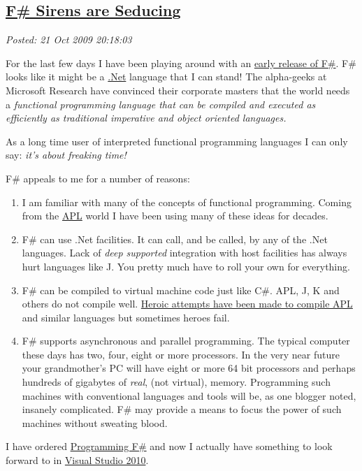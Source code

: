 %

\subsection*{\href{https://bakerjd99.wordpress.com/2009/10/21/f-sirens-are-seducing/}{F\# Sirens are Seducing}}


\noindent\emph{Posted: 21 Oct 2009 20:18:03}
\vspace{6pt}

For the last few days I have been playing around with an
\href{http://research.microsoft.com/en-us/um/cambridge/projects/fsharp/}{early
release of F\#}. F\# looks like it might be a
\href{http://www.microsoft.com/NET/}{.Net} language that I can stand!
The alpha-geeks at Microsoft Research have convinced their corporate
masters that the world needs a \emph{functional programming language
that can be compiled and executed as efficiently as traditional
imperative and object oriented languages.}

As a long time user of interpreted functional programming languages I
can only say: \emph{it's about freaking time!}

F\# appeals to me for a number of reasons:

\begin{enumerate}
\item
  I am familiar with many of the concepts of functional programming.
  Coming from the
  \href{http://en.wikipedia.org/wiki/APL\_(programming\_language)}{APL}
  world I have been using many of these ideas for decades.
\item
  F\# can use .Net facilities. It can call, and be called, by any of the
  .Net languages. Lack of \emph{deep supported} integration with host
  facilities has always hurt languages like J. You pretty much have to
  roll your own for everything.
\item
  F\# can be compiled to virtual machine code just like C\#. APL, J, K
  and others do not compile well.
  \href{http://www.snakeisland.com/}{Heroic attempts have been made to
  compile APL} and similar languages but sometimes heroes fail.
\item
  F\# supports asynchronous and parallel programming. The typical
  computer these days has two, four, eight or more processors. In the
  very near future your grandmother's PC will have eight or more 64 bit
  processors and perhaps hundreds of gigabytes of \emph{real}, (not
  virtual), memory. Programming such machines with conventional
  languages and tools will be, as one blogger noted, insanely
  complicated. F\# may provide a means to focus the power of such
  machines without sweating blood.
\end{enumerate}
I have ordered
\href{http://oreilly.com/catalog/9780596153656}{Programming F\#} and now
I actually have something to look forward to in
\href{http://www.microsoft.com/visualstudio/en-us/products/2010/default.mspx}{Visual
Studio 2010}.


%